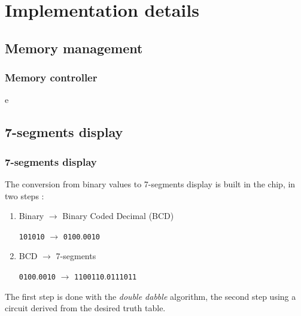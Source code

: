 \documentclass{beamer}
\begin{document}
\section{Implementation details}

\subsection{Memory management}

\begin{frame}
    \frametitle{Memory controller}
e
\end{frame}

\subsection{7-segments display}

\begin{frame}
\frametitle{7-segments display}
The conversion from binary values to 7-segments display is built in the chip, in two steps :
\begin{enumerate}
    \item Binary $\rightarrow$ Binary Coded Decimal (BCD)
        
          \texttt{101010} $\rightarrow$ \texttt{0100}.\texttt{0010}
    \item BCD $\rightarrow$ 7-segments

        \texttt{0100}.\texttt{0010} $\rightarrow$ \texttt{1100110}.\texttt{0111011}
\end{enumerate}

The first step is done with the \emph{double dabble} algorithm, the second step using a circuit derived
from the desired truth table.

\end{frame}
\end{document}
